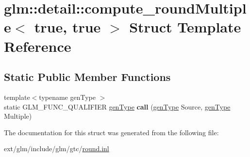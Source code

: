 \hypertarget{structglm_1_1detail_1_1compute__round_multiple_3_01true_00_01true_01_4}{\section{glm\-:\-:detail\-:\-:compute\-\_\-round\-Multiple$<$ true, true $>$ Struct Template Reference}
\label{structglm_1_1detail_1_1compute__round_multiple_3_01true_00_01true_01_4}
}
\subsection*{Static Public Member Functions}
\begin{DoxyCompactItemize}
\item 
\hypertarget{structglm_1_1detail_1_1compute__round_multiple_3_01true_00_01true_01_4_ad2ba30e3338e768e6119c957f44b2216}{{\footnotesize template$<$typename gen\-Type $>$ }\\static G\-L\-M\-\_\-\-F\-U\-N\-C\-\_\-\-Q\-U\-A\-L\-I\-F\-I\-E\-R \hyperlink{structglm_1_1detail_1_1gen_type}{gen\-Type} {\bfseries call} (\hyperlink{structglm_1_1detail_1_1gen_type}{gen\-Type} Source, \hyperlink{structglm_1_1detail_1_1gen_type}{gen\-Type} Multiple)}\label{structglm_1_1detail_1_1compute__round_multiple_3_01true_00_01true_01_4_ad2ba30e3338e768e6119c957f44b2216}

\end{DoxyCompactItemize}


The documentation for this struct was generated from the following file\-:\begin{DoxyCompactItemize}
\item 
ext/glm/include/glm/gtc/\hyperlink{round_8inl}{round.\-inl}\end{DoxyCompactItemize}
